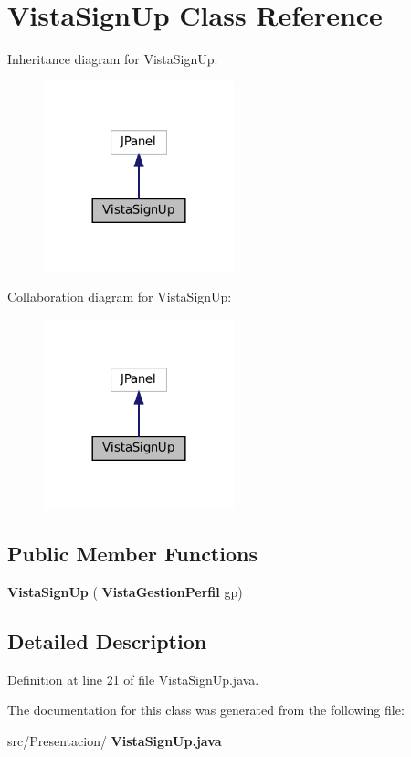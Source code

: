 \section{Vista\+Sign\+Up Class Reference}
\label{class_presentacion_1_1_vista_sign_up}


Inheritance diagram for Vista\+Sign\+Up\+:
\nopagebreak
\begin{figure}[H]
\begin{center}
\leavevmode
\includegraphics[width=156pt]{class_presentacion_1_1_vista_sign_up__inherit__graph}
\end{center}
\end{figure}


Collaboration diagram for Vista\+Sign\+Up\+:
\nopagebreak
\begin{figure}[H]
\begin{center}
\leavevmode
\includegraphics[width=156pt]{class_presentacion_1_1_vista_sign_up__coll__graph}
\end{center}
\end{figure}
\subsection*{Public Member Functions}
\begin{DoxyCompactItemize}
\item 
\mbox{\label{class_presentacion_1_1_vista_sign_up_ae1ca508ec6563c18e901dbb807071fc5}} 
{\bfseries Vista\+Sign\+Up} (\textbf{ Vista\+Gestion\+Perfil} gp)
\end{DoxyCompactItemize}


\subsection{Detailed Description}


Definition at line 21 of file Vista\+Sign\+Up.\+java.



The documentation for this class was generated from the following file\+:\begin{DoxyCompactItemize}
\item 
src/\+Presentacion/\textbf{ Vista\+Sign\+Up.\+java}\end{DoxyCompactItemize}
